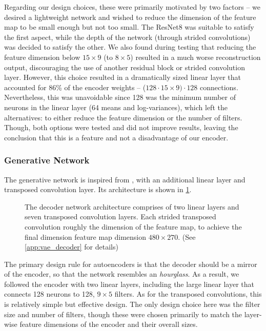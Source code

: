Regarding our design choices, these were primarily motivated by two factors -- we desired a lightweight network and wished to reduce the dimension of the feature map to be small enough but not too small. 
The ResNet8 was suitable to satisfy the first aspect, while the depth of the network (through strided convolutions) was decided to satisfy the other. We also found during testing that reducing the feature dimension below $15 \times 9$ (to $8 \times 5$) resulted in a much worse reconstruction output, discouraging the use of another residual block or strided convolution layer.
However, this choice resulted in a dramatically sized linear layer that accounted for 86\% of the encoder weights -- ($128 \cdot 15\times9) \cdot 128$ connections.
Nevertheless, this was unavoidable since 128 was the minimum number of neurons in the linear layer (64 means and log-variances), which left the alternatives: to either reduce the feature dimension or the number of filters. Though, both options were tested and did not improve results, leaving the conclusion that this is a feature and not a disadvantage of our encoder.


\subsubsection{Generative Network}
\label{subsubsec:5_vae_generative_network}
The generative network is inspired from \cite{vae_decoder_architecture}, with an additional linear layer and transposed convolution layer. Its architecture is shown in \cref{fig:5_decoder}. 
\begin{figure}[hbt]
    \centering
    \caption{The decoder network architecture comprises of two linear layers and seven transposed convolution layers. Each strided transposed convolution roughly the dimension of the feature map, to achieve the final dimension feature map dimension $480\times270$. (See \cref{app:vae_decoder} for details)}
    \label{fig:5_decoder}
\end{figure}
The primary design rule for autoencoders is that the decoder should be a mirror of the encoder, so that the network resembles an \textit{hourglass}. As a result, we followed the encoder with two linear layers, including the large linear layer that connects 128 neurons to 128, $9\times5$ filters. As for the transposed convolutions, this is relatively simple but effective design. The only design choice here was the filter size and number of filters, though these were chosen primarily to match the layer-wise feature dimensions of the encoder and their overall sizes.

